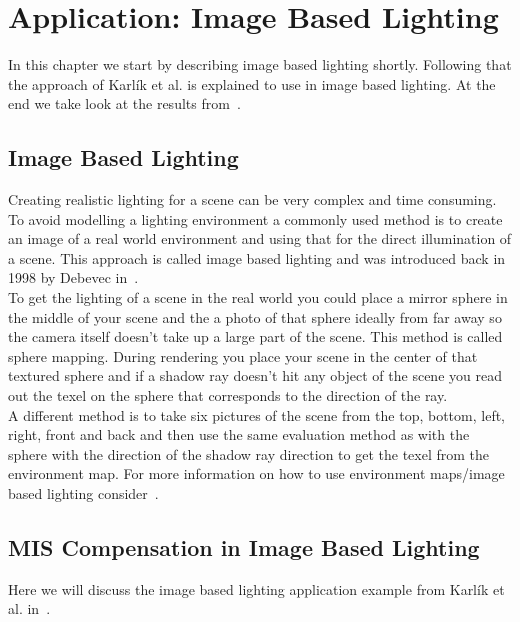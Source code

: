 \chapter{Application: Image Based Lighting}
\label{ch:application_ibl}
In this chapter we start by describing image based lighting shortly.
Following that the approach of Karl\'ik et al. is explained to use in image based lighting.
At the end we take look at the results from~\cite{Karlik2019}.


\section{Image Based Lighting}
\label{sec:ibl}
Creating realistic lighting for a scene can be very complex and time consuming.
To avoid modelling a lighting environment a commonly used method is to create an image of a real world environment
and using that for the direct illumination of a scene.
This approach is called image based lighting and was introduced back in 1998 by Debevec in~\cite{debevec}.\\
To get the lighting of a scene in the real world you could place a mirror sphere in the middle of your scene
and the a photo of that sphere ideally from far away
so the camera itself doesn't take up a large part of the scene.
This method is called sphere mapping.
During rendering you place your scene in the center of that textured sphere
and if a shadow ray doesn't hit any object of the scene you read out the texel
on the sphere that corresponds to the direction of the ray.\\
A different method is to take six pictures of the scene from the top, bottom, left, right, front and back
and then use the same evaluation method as with the sphere with the direction of the shadow ray direction
to get the texel from the environment map.
For more information on how to use environment maps/image based lighting consider~\cite{environment_map}.


\section{MIS Compensation in Image Based Lighting}
\label{sec:misc_ibl}
Here we will discuss the image based lighting application example from Karl\'ik et al. in~\cite[Section~6-7]{Karlik2019}.


